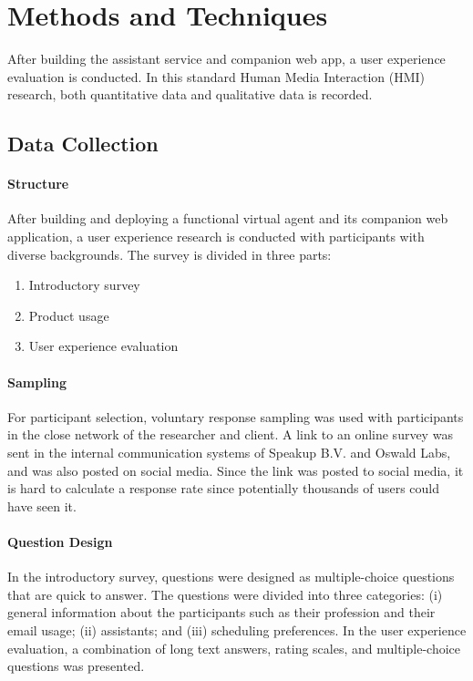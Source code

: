 \documentclass{article}
\begin{document}
\newpage

\section{Methods and Techniques}

After building the assistant service and companion web app, a user experience evaluation is conducted. In this standard Human Media Interaction (HMI) research, both quantitative data and qualitative data is recorded.

\subsection{Data Collection}

\paragraph{Structure}

After building and deploying a functional virtual agent and its companion web application, a user experience research is conducted with participants with diverse backgrounds. The survey is divided in three parts:

\begin{enumerate}
	\item Introductory survey
	\item Product usage
	\item User experience evaluation
\end{enumerate}

\paragraph{Sampling}

For participant selection, voluntary response sampling was used with participants in the close network of the researcher and client. A link to an online survey was sent in the internal communication systems of Speakup B.V. and Oswald Labs, and was also posted on social media. Since the link was posted to social media, it is hard to calculate a response rate since potentially thousands of users could have seen it.

\paragraph{Question Design}

In the introductory survey, questions were designed as multiple-choice questions that are quick to answer. The questions were divided into three categories: (i) general information about the participants such as their profession and their email usage; (ii) assistants; and (iii) scheduling preferences. In the user experience evaluation, a combination of long text answers, rating scales, and multiple-choice questions was presented.
\end{document}
